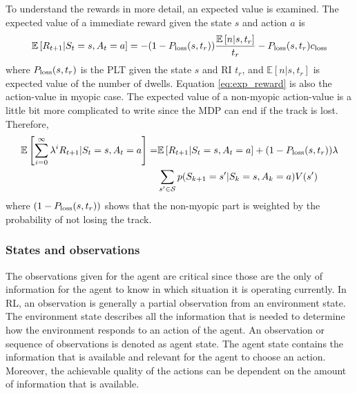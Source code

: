 \documentclass[english, 12pt, a4paper, elec, utf8, a-1b, online]{aaltothesis}
\newcommand{\Ss}{\mathcal{S}}
\newcommand{\E}[1]{\mathbb{E}\left[ #1 \right]}
\newcommand{\closs}{c_\text{loss}}
\newcommand{\ri}{t_r}
\begin{document}
To understand the rewards in more detail, an expected value is examined.
The expected value of a immediate reward given the state $s$ and action $a$ is
\begin{equation}\label{eq:exp_reward}
    \E{R_{t+1} | S_t=s, A_t=a} = -(1-\ploss(s, \ri)) 
        \frac
        {
            \mathbb{E} \left[ n | s, \ri \right]
        }
        {
        \ri
        } 
        - \ploss(s, \ri) \closs
\end{equation}
where $\ploss(s, \ri)$ is the PLT given the state $s$ and RI $\ri$, and $\E{n|s, \ri}$ is expected value of the number of dwells.
Equation \eqref{eq:exp_reward} is also the action-value in myopic case.
The expected value of a non-myopic action-value is a little bit more complicated to write since the MDP can end if the track is lost.
Therefore, 
\begin{align}
    \E{\sum_{i=0}^\infty \lambda^i R_{t+1} | S_t=s, A_t=a} =& \E{R_{t+1} | S_t=s, A_t=a} + (1-\ploss(s, \ri)) \lambda \\
    & \sum_{s'\in \Ss} p(S_{k+1}=s'|S_{k}=s, A_{k}=a)  V(s')  
\end{align}
where $(1-\ploss(s, \ri))$ shows that the non-myopic part is weighted by the probability of not losing the track.

\subsubsection{States and observations} \label{sec:states}

\newcommand{\glow}{g_\text{low}}
\newcommand{\ghigh}{g_\text{high}}

The observations given for the agent are critical since those are the only of information for the agent to know in which situation it is operating currently.
In RL, an observation is generally a partial observation from an environment state.
The environment state describes all the information that is needed to determine how the environment responds to an action of the agent. 
An observation or sequence of observations is denoted as agent state.
The agent state contains the information that is available and relevant for the agent to choose an action.
Moreover, the achievable quality of the actions can be dependent on the amount of information that is available. 
\end{document}
